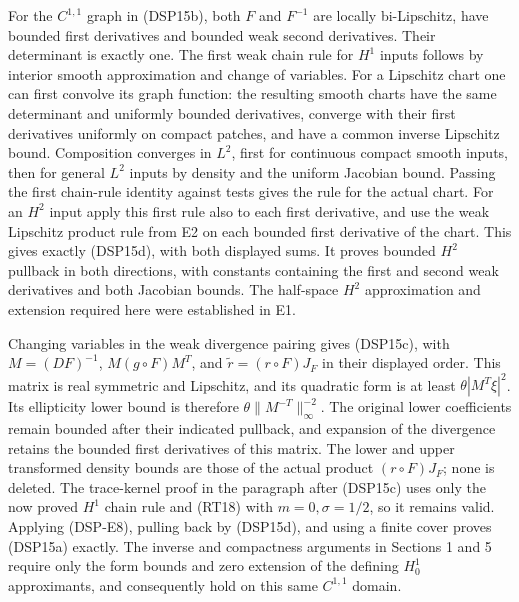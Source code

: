 \documentclass[
  11pt,
]{article}
\begin{document}
For the \(C^{1,1}\) graph in (DSP15b), both \(F\) and \(F^{-1}\) are
locally bi-Lipschitz, have bounded first derivatives and bounded weak
second derivatives. Their determinant is exactly one. The first weak
chain rule for \(H^1\) inputs follows by interior smooth approximation
and change of variables. For a Lipschitz chart one can first convolve
its graph function: the resulting smooth charts have the same
determinant and uniformly bounded derivatives, converge with their first
derivatives uniformly on compact patches, and have a common inverse
Lipschitz bound. Composition converges in \(L^2\), first for continuous
compact smooth inputs, then for general \(L^2\) inputs by density and
the uniform Jacobian bound. Passing the first chain-rule identity
against tests gives the rule for the actual chart. For an \(H^2\) input
apply this first rule also to each first derivative, and use the weak
Lipschitz product rule from E2 on each bounded first derivative of the
chart. This gives exactly (DSP15d), with both displayed sums. It proves
bounded \(H^2\) pullback in both directions, with constants containing
the first and second weak derivatives and both Jacobian bounds. The
half-space \(H^2\) approximation and extension required here were
established in E1.

Changing variables in the weak divergence pairing gives (DSP15c), with
\(M=(DF)^{-1}\), \(M(g\circ F)M^T\), and \(\widetilde r=(r\circ F)J_F\)
in their displayed order. This matrix is real symmetric and Lipschitz,
and its quadratic form is at least \(\theta|M^T\xi|^2\). Its ellipticity
lower bound is therefore \(\theta\|M^{-T}\|_\infty^{-2}\). The original
lower coefficients remain bounded after their indicated pullback, and
expansion of the divergence retains the bounded first derivatives of
this matrix. The lower and upper transformed density bounds are those of
the actual product \((r\circ F)J_F\); none is deleted. The trace-kernel
proof in the paragraph after (DSP15c) uses only the now proved \(H^1\)
chain rule and (RT18) with \(m=0,\sigma=1/2\), so it remains valid.
Applying (DSP-E8), pulling back by (DSP15d), and using a finite cover
proves (DSP15a) exactly. The inverse and compactness arguments in
Sections 1 and 5 require only the form bounds and zero extension of the
defining \(H_0^1\) approximants, and consequently hold on this same
\(C^{1,1}\) domain.
\end{document}
